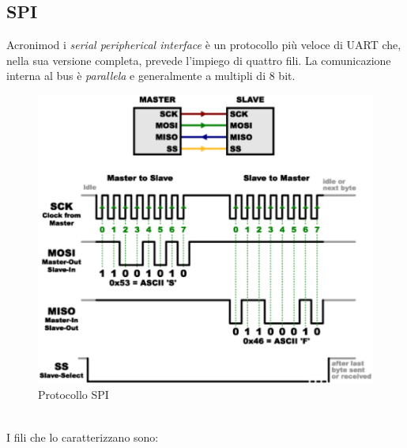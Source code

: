 \documentclass[12pt, a4paper]{report}
\begin{document}
\subsection{SPI}
Acronimod i \textit{serial peripherical interface} è un protocollo più veloce di UART che, nella sua versione completa, prevede l'impiego di quattro fili. La comunicazione interna al bus è \textit{parallela} e generalmente a multipli di 8 bit.
\begin{figure}[h]
    \centering
    \includegraphics[scale=0.4,angle=0]{spi.png}
    \caption{Protocollo SPI}
\end{figure}
\\I fili che lo caratterizzano sono:
\end{document}
